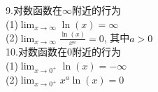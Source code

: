 \documentclass[UTF8, fontset=ubuntu]{ctexart}
\begin{document}
9.对数函数在$\infty$附近的行为\\[1ex]
(1)\quad$\displaystyle\lim_{x\to\infty}\ln(x)=\infty$\\[1ex]
(2)\quad$\displaystyle\lim_{x\to\infty}\frac{\ln(x)}{x^a}=0$, 其中$a>0$\\[1ex]

10.对数函数在0附近的行为\\[1ex]
(1)\quad$\displaystyle\lim_{x\to 0^+}\ln(x)=-\infty$\\[1ex]
(2)\quad$\displaystyle\lim_{x\to 0^+}x^a\ln(x)=0$\\[1ex]
\end{document}
